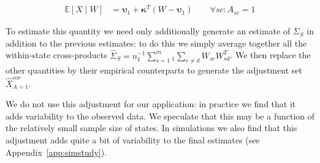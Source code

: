 \begin{align*}
    \mathbb{E}[X \mid W] &=  \boldsymbol{\upsilon}_1 + \boldsymbol{\kappa}^T(W - \boldsymbol{\upsilon}_1) \qquad \forall sc: A_{sc} = 1
\end{align*}

To estimate this quantity we need only additionally generate an estimate of $\Sigma_{S}$ in addition to the previous estimates: to do this we simply average together all the within-state cross-products $\hat{\Sigma}_{S} = n_1^{-1}\sum_{s=1}^m_1\sum_{c\ne d}W_{sc}W_{sd}^T$. We then replace the other quantities by their empirical counterparts to generate the adjustment set $\hat{X}_{A=1}^{cor}$.

We do not use this adjustment for our application: in practice we find that it adds variability to the observed data. We speculate that this may be a function of the relatively small sample size of states. In simulations we also find that this adjustment adds quite a bit of variability to the final estimates (see Appendix~\ref{app:simstudy}). 